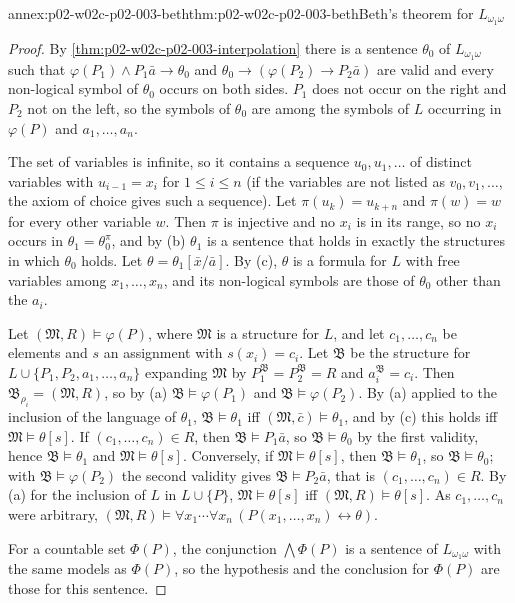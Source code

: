 \begin{annexitem}{annex:p02-w02c-p02-003-beth}{thm:p02-w02c-p02-003-beth}{Beth's theorem for \(L_{\omega_1\omega}\)}
\begin{proof}
By \cref{thm:p02-w02c-p02-003-interpolation} there is a sentence
\(\theta_0\) of \(L_{\omega_1\omega}\) such that
\(\varphi(P_1)\land P_1\bar a\to\theta_0\) and
\(\theta_0\to(\varphi(P_2)\to P_2\bar a)\) are valid and every non-logical
symbol of \(\theta_0\) occurs on both sides.  \(P_1\) does not occur on
the right and \(P_2\) not on the left, so the symbols of \(\theta_0\) are
among the symbols of \(L\) occurring in \(\varphi(P)\) and
\(a_1,\ldots,a_n\).

The set of variables is infinite, so it contains a sequence
\(u_0,u_1,\ldots\) of distinct variables with \(u_{i-1}=x_i\) for
\(1\leq i\leq n\) (if the variables are not listed as \(v_0,v_1,\ldots\),
the axiom of choice gives such a sequence).  Let \(\pi(u_k)=u_{k+n}\) and
\(\pi(w)=w\) for every other variable \(w\).  Then \(\pi\) is injective
and no \(x_i\) is in its range, so no \(x_i\) occurs in
\(\theta_1=\theta_0^{\pi}\), and by (b) \(\theta_1\) is a sentence that
holds in exactly the structures in which \(\theta_0\) holds.  Let
\(\theta=\theta_1[\bar x/\bar a]\).  By (c), \(\theta\) is a formula for
\(L\) with free variables among \(x_1,\ldots,x_n\), and its non-logical
symbols are those of \(\theta_0\) other than the \(a_i\).

Let \((\mathfrak M,R)\models\varphi(P)\), where \(\mathfrak M\) is a
structure for \(L\), and let \(c_1,\ldots,c_n\) be elements and \(s\) an
assignment with \(s(x_i)=c_i\).  Let \(\mathfrak B\) be the structure for
\(L\cup\{P_1,P_2,a_1,\ldots,a_n\}\) expanding \(\mathfrak M\) by
\(P_1^{\mathfrak B}=P_2^{\mathfrak B}=R\) and \(a_i^{\mathfrak B}=c_i\).
Then \(\mathfrak B_{\rho_i}=(\mathfrak M,R)\), so by (a)
\(\mathfrak B\models\varphi(P_1)\) and \(\mathfrak B\models\varphi(P_2)\).
By (a) applied to the inclusion of the language of \(\theta_1\),
\(\mathfrak B\models\theta_1\) iff
\((\mathfrak M,\bar c)\models\theta_1\), and by (c) this holds iff
\(\mathfrak M\models\theta[s]\).  If \((c_1,\ldots,c_n)\in R\), then
\(\mathfrak B\models P_1\bar a\), so \(\mathfrak B\models\theta_0\) by the
first validity, hence \(\mathfrak B\models\theta_1\) and
\(\mathfrak M\models\theta[s]\).  Conversely, if
\(\mathfrak M\models\theta[s]\), then \(\mathfrak B\models\theta_1\), so
\(\mathfrak B\models\theta_0\); with \(\mathfrak B\models\varphi(P_2)\)
the second validity gives \(\mathfrak B\models P_2\bar a\), that is
\((c_1,\ldots,c_n)\in R\).  By (a) for the inclusion of \(L\) in
\(L\cup\{P\}\), \(\mathfrak M\models\theta[s]\) iff
\((\mathfrak M,R)\models\theta[s]\).  As \(c_1,\ldots,c_n\) were
arbitrary, \((\mathfrak M,R)\models\forall x_1\cdots\forall
x_n\,(P(x_1,\ldots,x_n)\leftrightarrow\theta)\).

For a countable set \(\Phi(P)\), the conjunction \(\bigwedge\Phi(P)\) is
a sentence of \(L_{\omega_1\omega}\) with the same models as \(\Phi(P)\),
so the hypothesis and the conclusion for \(\Phi(P)\) are those for this
sentence.
\end{proof}
\end{annexitem}

